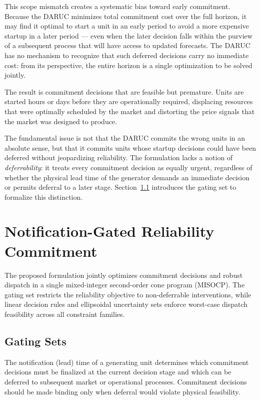 \documentclass[journal]{IEEEtran}
\begin{document}
This scope mismatch creates a systematic bias toward early
commitment.
Because the DARUC minimizes total commitment cost over the full
horizon, it may find it optimal to start a unit in an early period
to avoid a more expensive startup in a later period --- even when
the later decision falls within the purview of a subsequent process
that will have access to updated forecasts.
The DARUC has no mechanism to recognize that such deferred decisions
carry no immediate cost: from its perspective, the entire horizon
is a single optimization to be solved jointly.

The result is commitment decisions that are feasible but premature.
Units are started hours or days before they are operationally
required, displacing resources that were optimally scheduled by the
market and distorting the price signals that the market was designed
to produce.

The fundamental issue is not that the DARUC commits the wrong units
in an absolute sense, but that it commits units whose startup
decisions could have been deferred without jeopardizing reliability.
The formulation lacks a notion of \emph{deferrability}: it treats
every commitment decision as equally urgent, regardless of whether
the physical lead time of the generator demands an immediate
decision or permits deferral to a later stage.
Section~\ref{sec:gating} introduces the gating set to formalize
this distinction.


\section{Notification-Gated Reliability Commitment}

The proposed formulation jointly optimizes commitment decisions and
robust dispatch in a single mixed-integer second-order cone program
(MISOCP).
The gating set restricts the reliability objective to non-deferrable
interventions, while linear decision rules and ellipsoidal uncertainty
sets enforce worst-case dispatch feasibility across all constraint
families.

\subsection{Gating Sets}\label{sec:gating}

The notification (lead) time of a generating unit determines which
commitment decisions must be finalized at the current decision stage
and which can be deferred to subsequent market or operational
processes.
Commitment decisions should be made binding only when deferral would
violate physical feasibility.
\end{document}

